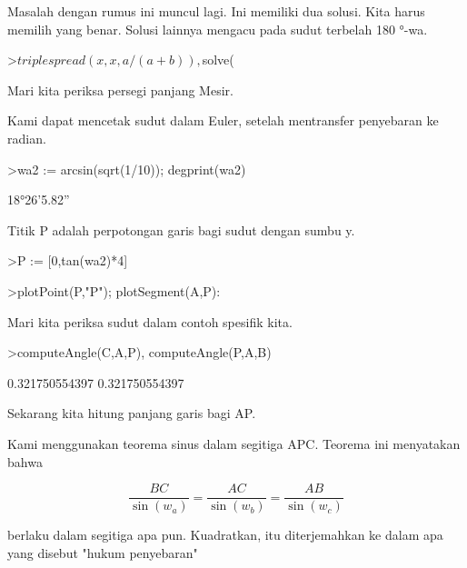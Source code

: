 \documentclass[a4paper,10pt]{article}
\begin{document}
\begin{eulernotebook}
\begin{eulercomment}
\begin{eulercomment}
\begin{eulercomment}
Masalah dengan rumus ini muncul lagi. Ini memiliki dua solusi. Kita
harus memilih yang benar. Solusi lainnya mengacu pada sudut terbelah
180 °-wa.
\end{eulercomment}
\begin{eulerprompt}
>$triplespread(x,x,a/(a+b)), $solve(%
\end{eulerprompt}
\begin{eulercomment}
Mari kita periksa persegi panjang Mesir.
\end{eulercomment}
\begin{eulercomment}
Kami dapat mencetak sudut dalam Euler, setelah mentransfer penyebaran
ke radian.
\end{eulercomment}
\begin{eulerprompt}
>wa2 := arcsin(sqrt(1/10)); degprint(wa2)
\end{eulerprompt}
\begin{euleroutput}
  18°26'5.82''
\end{euleroutput}
\begin{eulercomment}
Titik P adalah perpotongan garis bagi sudut dengan sumbu y.
\end{eulercomment}
\begin{eulerprompt}
>P := [0,tan(wa2)*4]
\end{eulerprompt}
\begin{euleroutput}
  [0,  1.33333]
\end{euleroutput}
\begin{eulerprompt}
>plotPoint(P,"P"); plotSegment(A,P):
\end{eulerprompt}
\begin{eulercomment}
Mari kita periksa sudut dalam contoh spesifik kita.
\end{eulercomment}
\begin{eulerprompt}
>computeAngle(C,A,P), computeAngle(P,A,B)
\end{eulerprompt}
\begin{euleroutput}
  0.321750554397
  0.321750554397
\end{euleroutput}
\begin{eulercomment}
Sekarang kita hitung panjang garis bagi AP.

Kami menggunakan teorema sinus dalam segitiga APC. Teorema ini
menyatakan bahwa

\end{eulercomment}
\begin{eulerformula}
\[
\frac{BC}{\sin(w_a)} = \frac{AC}{\sin(w_b)} = \frac{AB}{\sin(w_c)}
\]
\end{eulerformula}
\begin{eulercomment}
berlaku dalam segitiga apa pun. Kuadratkan, itu diterjemahkan ke dalam
apa yang disebut "hukum penyebaran"


\end{eulercomment}
\end{eulercomment}
\end{eulercomment}
\end{eulernotebook}
\end{document}
